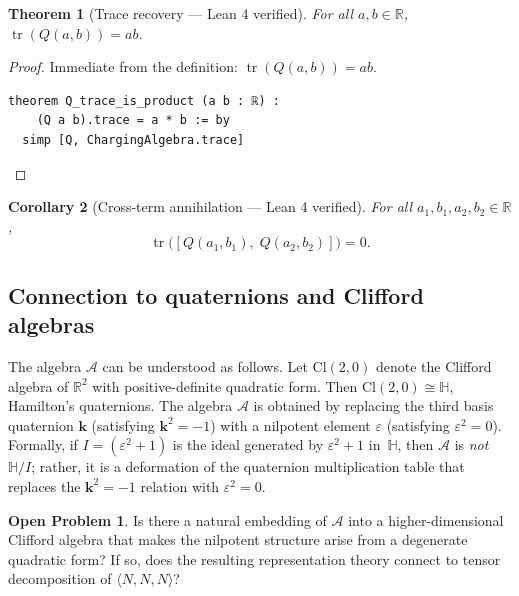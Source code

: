 \documentclass[11pt,a4paper]{article}
\newtheorem{theorem}{Theorem}[section]
\newtheorem{corollary}[theorem]{Corollary}
\theoremstyle{definition}
\newtheorem{openproblem}{Open Problem}[section]
\theoremstyle{remark}
\DeclareMathOperator{\tr}{tr}
\newcommand{\mmtensor}[3]{\langle #1, #2, #3 \rangle}
\begin{document}
\begin{theorem}[Trace recovery --- Lean 4 verified]\label{thm:trace-recovery}
For all $a, b \in \mathbb{R}$, $\tr(Q(a,b)) = ab$.
\end{theorem}

\begin{proof}
Immediate from the definition: $\tr(Q(a,b)) = ab$.
\begin{lstlisting}[language=Lean]
theorem Q_trace_is_product (a b : ℝ) :
    (Q a b).trace = a * b := by
  simp [Q, ChargingAlgebra.trace]
\end{lstlisting}
\end{proof}

\begin{corollary}[Cross-term annihilation --- Lean 4 verified]
\label{cor:cross-annihilation}
For all $a_1, b_1, a_2, b_2 \in \mathbb{R}$,
\[
  \tr\bigl([Q(a_1, b_1),\; Q(a_2, b_2)]\bigr) = 0.
\]
\end{corollary}

\subsection{Connection to quaternions and Clifford algebras}

The algebra $\mathcal{A}$ can be understood as follows. Let
$\mathrm{Cl}(2,0)$ denote the Clifford algebra of $\mathbb{R}^2$
with positive-definite quadratic form. Then
$\mathrm{Cl}(2,0) \cong \mathbb{H}$, Hamilton's quaternions.
The algebra $\mathcal{A}$ is obtained by replacing the third
basis quaternion $\mathbf{k}$ (satisfying $\mathbf{k}^2 = -1$)
with a nilpotent element $\varepsilon$ (satisfying
$\varepsilon^2 = 0$). Formally, if $I = (\varepsilon^2 + 1)$
is the ideal generated by $\varepsilon^2 + 1$ in~$\mathbb{H}$,
then $\mathcal{A}$ is \emph{not} $\mathbb{H}/I$; rather, it is a
deformation of the quaternion multiplication table that replaces
the $\mathbf{k}^2 = -1$ relation with $\varepsilon^2 = 0$.

\begin{openproblem}\label{op:clifford}
Is there a natural embedding of $\mathcal{A}$ into a
higher-dimensional Clifford algebra that makes the nilpotent
structure arise from a degenerate quadratic form? If so, does the
resulting representation theory connect to tensor decomposition
of $\mmtensor{N}{N}{N}$?
\end{openproblem}

\end{document}
